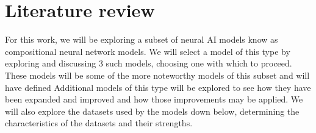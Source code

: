 \chapter{Literature review}
\label{chp:literature_review}

For this work, we will be exploring a subset of neural AI models know as compositional neural network models.
We will select a model of this type by exploring and discussing 3 such models, choosing one with which to proceed.
These models will be some of the more noteworthy models of this subset and will have defined 
Additional models of this type will be explored to see how they have been expanded and improved and how those improvements may be applied.
We will also explore the datasets used by the models down below, determining the characteristics of the datasets and their strengths.


\clearpage


\clearpage


\clearpage
